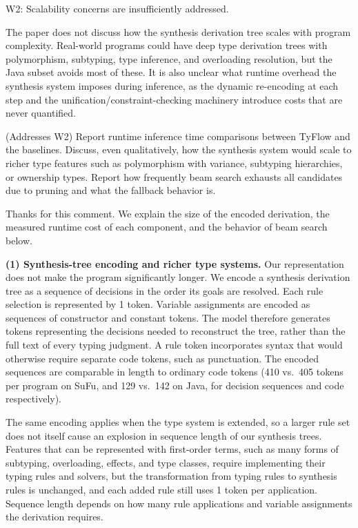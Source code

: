 \documentclass[11pt,a4paper]{article}
\newenvironment{revcomment}[1]{%
  \par\vspace{1.9em}\needspace{5\baselineskip}\noindent{\color{black!30}\hrule height 0.4pt}%
  \smallskip\par\noindent{\bfseries\color{accent}#1}\par\nopagebreak
  \vspace{2pt}%
  \begin{tcolorbox}[enhanced, breakable, frame hidden,
    colback=black!3, borderline west={1.6pt}{0pt}{accent!70},
    left=9pt, right=6pt, top=5pt, bottom=5pt,
    fontupper=\small\itshape, before skip=0pt, after skip=0pt,
    breakable, pad at break*=3pt]\setlength{\parskip}{0.3em}%
}{\end{tcolorbox}}
\newcommand{\response}{\par\medskip\needspace{3\baselineskip}\noindent{\bfseries\color{accent}Response.}%
  \par\nopagebreak\smallskip\ignorespaces}
\begin{document}
\label{com:2.2}
\begin{revcomment}{Comment 2.2.}
W2: Scalability concerns are insufficiently addressed.\par\smallskip
The paper does not discuss how the synthesis derivation tree scales with
program complexity. Real-world programs could have deep type derivation
trees with polymorphism, subtyping, type inference, and overloading
resolution, but the Java subset avoids most of these. It is also unclear
what runtime overhead the synthesis system imposes during inference, as the
dynamic re-encoding at each step and the unification/constraint-checking
machinery introduce costs that are never quantified.\par\smallskip

(Addresses W2) Report runtime inference time comparisons
between TyFlow and the baselines. Discuss, even qualitatively, how the
synthesis system would scale to richer type features such as polymorphism
with variance, subtyping hierarchies, or ownership types. Report how
frequently beam search exhausts all candidates due to pruning and what the
fallback behavior is.
\end{revcomment}

\response Thanks for this comment. We explain the size of the encoded derivation, the measured runtime cost of each component, and the behavior of beam search below.

\textbf{(1) Synthesis-tree encoding and richer type systems.} Our representation does not make the program significantly longer. We encode a synthesis derivation tree as a sequence of decisions in the order its goals are resolved. Each rule selection is represented by 1 token. Variable assignments are encoded as sequences of constructor and constant tokens. The model therefore generates tokens representing the decisions needed to reconstruct the tree, rather than the full text of every typing judgment. A rule token incorporates syntax that would otherwise require separate code tokens, such as punctuation. The encoded sequences are comparable in length to ordinary code tokens (410 vs.\ 405 tokens per program on SuFu, and 129 vs.\ 142 on Java, for decision sequences and code respectively).

The same encoding applies when the type system is extended, so a larger rule set does not itself cause an explosion in sequence length of our synthesis trees. Features that can be represented with first-order terms, such as many forms of subtyping, overloading, effects, and type classes, require implementing their typing rules and solvers, but the transformation from typing rules to synthesis rules is unchanged, and each added rule still uses 1 token per application. Sequence length depends on how many rule applications and variable assignments the derivation requires.
\end{document}
